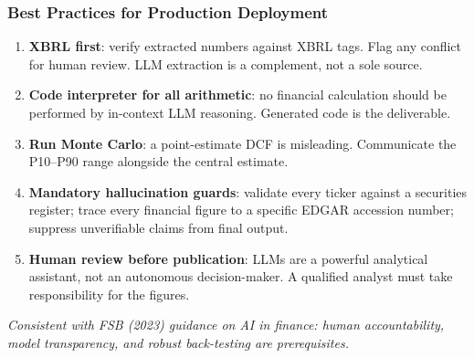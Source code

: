 \documentclass[9pt,t]{beamer}
\begin{document}
\begin{frame}
\frametitle{Best Practices for Production Deployment}

\begin{enumerate}
  \item \textbf{XBRL first}: verify extracted numbers against XBRL tags.
        Flag any conflict for human review. LLM extraction is a complement, not a sole source.

  \item \textbf{Code interpreter for all arithmetic}: no financial calculation should be
        performed by in-context LLM reasoning. Generated code is the deliverable.

  \item \textbf{Run Monte Carlo}: a point-estimate DCF is misleading.
        Communicate the P10--P90 range alongside the central estimate.

  \item \textbf{Mandatory hallucination guards}: validate every ticker against a securities register;
        trace every financial figure to a specific EDGAR accession number;
        suppress unverifiable claims from final output.

  \item \textbf{Human review before publication}: LLMs are a powerful analytical assistant,
        not an autonomous decision-maker.
        A qualified analyst must take responsibility for the figures.
\end{enumerate}

\medskip
\textit{Consistent with FSB (2023) guidance on AI in finance: human accountability,
model transparency, and robust back-testing are prerequisites.}
\end{frame}
\end{document}
